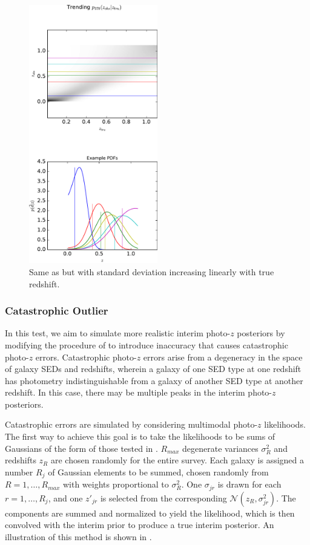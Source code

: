 \begin{figure}
	\includegraphics[width=0.5\textwidth]{figures/chippr/vars_zobsvztru.pdf}
	\caption{Same as  but with standard deviation increasing linearly with true redshift.}
\end{figure}

\subsubsection{Catastrophic Outlier}

In this test, we aim to simulate more realistic interim photo-$z$ posteriors by modifying the procedure of  to introduce inaccuracy that causes catastrophic photo-$z$ errors.  
Catastrophic photo-$z$ errors arise from a degeneracy in the space of galaxy SEDs and redshifts, wherein a galaxy of one SED type at one redshift has photometry indistinguishable from a galaxy of another SED type at another redshift.  
In this case, there may be multiple peaks in the interim photo-$z$ posteriors.  

Catastrophic errors are simulated by considering multimodal photo-$z$ likelihoods.  
The first way to achieve this goal is to take the likelihoods to be sums of Gaussians of the form of those tested in .  
$R_{max}$ degenerate variances $\sigma_{R}^{2} $ and redshifts $z_{R}$ are chosen randomly for the entire survey.  
Each galaxy is assigned a number $R_{j}$ of Gaussian elements to be summed, chosen randomly from $R=1,\dots,R_{max}$ with weights proportional to $\sigma_{R}^{2}$.  
One $\sigma_{jr}$ is drawn for each $r=1,\dots,R_{j}$, and one $z'_{jr}$ is selected from the corresponding $\mathcal{N}(z_{R},\sigma^{2}_{jr})$.  
The components are summed and normalized to yield the likelihood, which is then convolved with the interim prior to produce a true interim posterior.   
An illustration of this method is shown in . 

